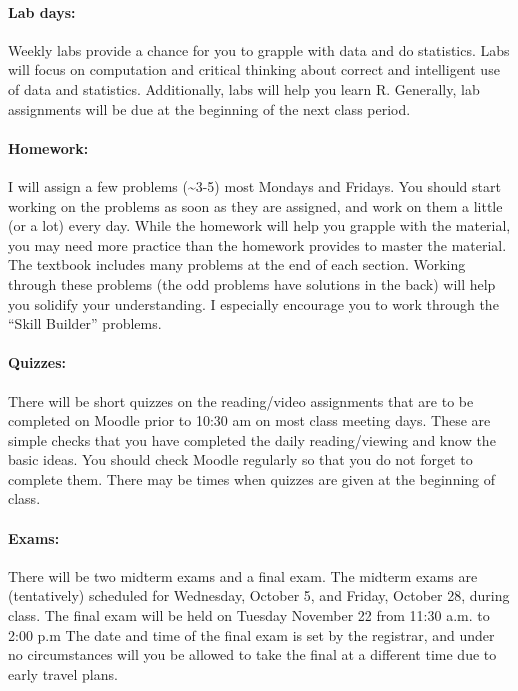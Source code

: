\documentclass[11pt,]{article}
\begin{document}
\paragraph{Lab days:}\label{lab-days}

Weekly labs provide a chance for you to grapple with data and do
statistics. Labs will focus on computation and critical thinking about
correct and intelligent use of data and statistics. Additionally, labs
will help you learn R. Generally, lab assignments will be due at the
beginning of the next class period.

\paragraph{Homework:}\label{homework}

I will assign a few problems (\textasciitilde{}3-5) most Mondays and
Fridays. You should start working on the problems as soon as they are
assigned, and work on them a little (or a lot) every day. While the
homework will help you grapple with the material, you may need more
practice than the homework provides to master the material. The textbook
includes many problems at the end of each section. Working through these
problems (the odd problems have solutions in the back) will help you
solidify your understanding. I especially encourage you to work through
the ``Skill Builder'' problems.

\paragraph{Quizzes:}\label{quizzes}

There will be short quizzes on the reading/video assignments that are to
be completed on Moodle prior to 10:30 am on most class meeting days.
These are simple checks that you have completed the daily
reading/viewing and know the basic ideas. You should check Moodle
regularly so that you do not forget to complete them. There may be times
when quizzes are given at the beginning of class.

\paragraph{Exams:}\label{exams}

There will be two midterm exams and a final exam. The midterm exams are
(tentatively) scheduled for Wednesday, October 5, and Friday, October
28, during class. The final exam will be held on Tuesday November 22
from 11:30 a.m. to 2:00 p.m The date and time of the final exam is set
by the registrar, and under no circumstances will you be allowed to take
the final at a different time due to early travel plans.
\end{document}
